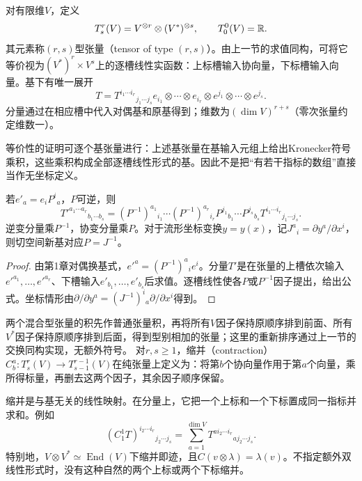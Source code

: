 \begin{definition}[张量的型别与分量]
对有限维$V$，定义
\[
 T^r_s(V)=V^{\otimes r}\otimes(V^*)^{\otimes s},\qquad T^0_0(V)=\mathbb{R}.
\]
其元素称$(r,s)$型张量（tensor of type $(r,s)$）。由上一节的求值同构，可将它等价视为$(V^*)^r\times V^s$上的逐槽线性实函数：上标槽输入协向量，下标槽输入向量。基下有唯一展开
\[
 T=T^{i_1\cdots i_r}{}_{j_1\cdots j_s}
 e_{i_1}\otimes\cdots\otimes e_{i_r}\otimes
 e^{j_1}\otimes\cdots\otimes e^{j_s}.
\]
分量通过在相应槽中代入对偶基和原基得到；维数为$(\dim V)^{r+s}$（零次张量约定维数一）。
\end{definition}
等价性的证明可逐个基张量进行：上述基张量在基输入元组上给出Kronecker符号乘积，这些乘积构成全部逐槽线性形式的基。因此不是把“有若干指标的数组”直接当作无坐标定义。
\begin{theorem}[张量换基律]\label{thm:tensor-transform}
若$e'_a=e_iP^i{}_a$，$P$可逆，则
\[
 T'^{a_1\cdots a_r}{}_{b_1\cdots b_s}
 =(P^{-1})^{a_1}{}_{i_1}\cdots(P^{-1})^{a_r}{}_{i_r}
 P^{j_1}{}_{b_1}\cdots P^{j_s}{}_{b_s}
 T^{i_1\cdots i_r}{}_{j_1\cdots j_s}.
\]
逆变分量乘$P^{-1}$，协变分量乘$P$。对于流形坐标变换$y=y(x)$，记$J^a{}_i=\partial y^a/\partial x^i$，则切空间新基对应$P=J^{-1}$。
\end{theorem}
\begin{proof}
由第1章对偶换基式，$e'^a=(P^{-1})^a{}_i e^i$。分量$T'$是在张量的上槽依次输入$e'^{a_1},\ldots,e'^{a_r}$、下槽输入$e'_{b_1},\ldots,e'_{b_s}$后求值。逐槽线性使各$P$或$P^{-1}$因子提出，给出公式。坐标情形由$\partial/\partial y^a=(J^{-1})^i{}_a\partial/\partial x^i$得到。
\end{proof}
\begin{definition}[张量积与缩并]
两个混合型张量的积先作普通张量积，再将所有$V$因子保持原顺序排到前面、所有$V^*$因子保持原顺序排到后面，得到型别相加的张量；这里的重新排序通过上一节的交换同构实现，无额外符号。
对$r,s\geq1$，缩并（contraction）$C^a_b:T^r_s(V)\to T^{r-1}_{s-1}(V)$在纯张量上定义为：将第$b$个协向量作用于第$a$个向量，乘所得标量，再删去这两个因子，其余因子顺序保留。
\end{definition}
\begin{theorem}[缩并的良定义与基无关性]\label{thm:contraction}
缩并是与基无关的线性映射。在分量上，它把一个上标和一个下标置成同一指标并求和。例如
\[
 (C^1_1T)^{i_2\cdots i_r}{}_{j_2\cdots j_s}
 =\sum_{a=1}^{\dim V}T^{a i_2\cdots i_r}{}_{a j_2\cdots j_s}.
\]
特别地，$V\otimes V^*\simeq\operatorname{End}(V)$下缩并即迹，且$C(v\otimes\lambda)=\lambda(v)$。不指定额外双线性形式时，没有这种自然的两个上标或两个下标缩并。
\end{theorem}
